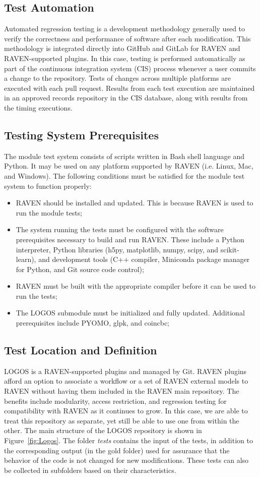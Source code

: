 \subsection{Test Automation}
Automated regression testing is a development methodology generally used
to verify the correctness and performance of software after each modification.
This methodology is integrated directly into GitHub and GitLab for RAVEN and
RAVEN-supported plugins. In this case, testing is performed automatically as part of the
continuous integration system (CIS) process whenever a user commits a change to the
repository. Tests of changes across multiple platforms are executed with each pull
request. Results from each test execution are maintained in an approved records
repository in the CIS database, along with results from the timing executions.

\subsection{Testing System Prerequisites}
The module test system consists of scripts written in Bash shell language
and Python. It may be used on any platform supported by RAVEN (i.e.
Linux, Mac, and Windows). The following conditions must be satisfied for the
module test system to function properly:
\begin{itemize}
  \item RAVEN should be installed and updated. This is because RAVEN is used to
  run the module tests;
  \item The system running the tests must be configured with the software prerequisites
  necessary to build and run RAVEN. These include a Python interpreter, Python
  libraries (h5py, matplotlib, numpy, scipy, and scikit-learn), and development
  tools (C++ compiler, Miniconda package manager for Python, and Git source code control);
  \item RAVEN must be built with the appropriate compiler before it can be used to
  run the tests;
  \item The LOGOS submodule must be initialized and fully updated. Additional prerequisites
  include PYOMO, glpk, and coincbc;
\end{itemize}

\subsection{Test Location and Definition}
LOGOS is a RAVEN-supported plugins and managed by Git. RAVEN plugins afford
an option to associate a workflow or a set of RAVEN external models to RAVEN
without having them included in the RAVEN main repository. The benefits include
modularity, access restriction, and regression testing for compatibility with RAVEN
as it continues to grow. In this case, we are able to treat this repository as
separate, yet still be able to use one from within the other. The main structure
of the LOGOS repository is shown in Figure~\ref{fig:Logos}. The folder \textit{tests} contains the input of
the tests, in addition to the corresponding output (in the gold folder) used for
assurance that the behavior of the code is not changed for new modifications. These
tests can also be collected in subfolders based on their characteristics.

